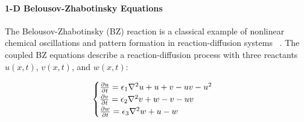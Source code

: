 %

\paragraph{1-D Belousov-Zhabotinsky Equations} 
The Belousov-Zhabotinsky (BZ) reaction is a classical example of nonlinear chemical oscillations and pattern formation in reaction-diffusion systems ~\citep{taylor2002mechanism}. The coupled BZ equations describe a reaction-diffusion process with three reactants $u(x,t)$, $v(x,t)$, and $w(x,t)$:

\begin{equation}
	\begin{cases}
		\frac{\partial u}{\partial t} = \epsilon_1 \nabla^2 u + u + v - uv - u^2 \\
		\frac{\partial v}{\partial t} = \epsilon_2 \nabla^2 v + w - v - uv \\
		\frac{\partial w}{\partial t} = \epsilon_3 \nabla^2 w + u - w \notag
	\end{cases}
\end{equation}

